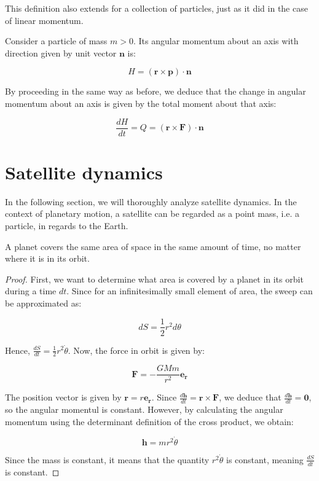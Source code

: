 \documentclass[12pt]{article}
\begin{document}
This definition also extends for a collection of particles, just as it did in the case of linear momentum.

\begin{definition}
    Consider a particle of mass $m > 0$. Its angular momentum about an axis with direction given by unit vector $\mathbf{n}$ is:

    \[ H = \left(\mathbf{r} \times \mathbf{p}\right) \cdot \mathbf{n} \]
\end{definition}

By proceeding in the same way as before, we deduce that the change in angular momentum about an axis is given by the total moment about that axis:

\[ \frac{dH}{dt} = Q = \left(\mathbf{r} \times \mathbf{F}\right) \cdot \mathbf{n} \]

\newpage

\section{Satellite dynamics}

In the following section, we will thoroughly analyze satellite dynamics. In the context of planetary motion, a satellite can be regarded as a point mass, i.e. a particle, in regards to the Earth.

\begin{theorem}
    A planet covers the same area of space in the same amount of time, no matter where it is in its orbit.
\end{theorem}

\begin{proof}
    First, we want to determine what area is covered by a planet in its orbit during a time $dt$. Since for an infinitesimally small element of area, the sweep can be approximated as:

    \[ dS = \frac{1}{2}r^2d\theta \]

    Hence, $\frac{dS}{dt} = \frac{1}{2}r^2\dot{\theta}$. Now, the force in orbit is given by:

    \[ \mathbf{F} = -\frac{GMm}{r^2}\mathbf{e_r} \]

    The position vector is given by $\mathbf{r} = r\mathbf{e_r}$. Since $\frac{d\mathbf{h}}{dt} = \mathbf{r} \times \mathbf{F}$, we deduce that $\frac{d\mathbf{h}}{dt} = \mathbf{0}$, so the angular momentul is constant. However, by calculating the angular momentum using the determinant definition of the cross product, we obtain:

    \[ \mathbf{h} = mr^2\dot{\theta} \]

    Since the mass is constant, it means that the quantity $r^2\dot{\theta}$ is constant, meaning $\frac{dS}{dt}$ is constant.
\end{proof}
\end{document}
